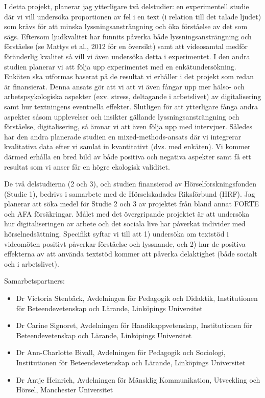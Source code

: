 \documentclass[]{article}
\providecommand{\tightlist}{%
  \setlength{\itemsep}{0pt}\setlength{\parskip}{0pt}}
\begin{document}
I detta projekt, planerar jag ytterligare två delstudier: en
experimentell studie där vi vill undersöka proportionen av fel i en text
(i relation till det talade ljudet) som krävs för att minska
lyssningsansträngning och öka förståelse av det som sägs. Eftersom
ljudkvalitet har funnits påverka både lyssningsansträngning och
förståelse (se Mattys et al., 2012 för en översikt) samt att videosamtal
medför föränderlig kvalitet så vill vi även undersöka detta i
experimentet. I den andra studien planerar vi att följa upp experimentet
med en enkätundersökning. Enkäten ska utformas baserat på de resultat vi
erhåller i det projekt som redan är finansierat. Denna ansats gör att vi
att vi även fångar upp mer hälso- och arbetspsykologiska aspekter (exv.
stress, deltagande i arbetslivet) av digitalisering samt hur textningens
eventuella effekter. Slutligen för att ytterligare fånga andra aspekter
såsom upplevelser och insikter gällande lyssningsansträngning och
förståelse, digitalisering, så ämnar vi att även följa upp med
intervjuer. Således har den andra planerade studien en
mixed-methods-ansats där vi integrerar kvalitativa data efter vi samlat
in kvantitativt (dvs. med enkäten). Vi kommer därmed erhålla en bred
bild av både positiva och negativa aspekter samt få ett resultat som vi
anser får en högre ekologisk validitet.

De två delstudierna (2 och 3), och studien finansierad av
Hörselforskningsfonden (Studie 1), bedrivs i samarbete med de
Hörselskadades Riksförbund (HRF). Jag planerar att söka medel för Studie
2 och 3 av projektet från bland annat FORTE och AFA försäkringar. Målet
med det övergripande projektet är att undersöka hur digitaliseringen av
arbete och det sociala live har påverkat individer med
hörselnedsättning. Specifikt syftar vi till att 1) undersöka om textstöd
i videomöten positivt påverkar förståelse och lyssnande, och 2) hur de
positiva effekterna av att använda textstöd kommer att påverka
delaktighet (både socialt och i arbetslivet).

Samarbetspartners:

\begin{itemize}
\tightlist
\item
  Dr Victoria Stenbäck, Avdelningen för Pedagogik och Didaktik,
  Institutionen för Beteendevetenskap och Lärande, Linköpings
  Universitet
\item
  Dr Carine Signoret, Avdelningen för Handikappvetenskap, Institutionen
  för Beteendevetenskap och Lärande, Linköpings Universitet
\item
  Dr Ann-Charlotte Bivall, Avdelningen för Pedagogik och Sociologi,
  Institutionen för Beteendevetenskap och Lärande, Linköpings
  Universitet
\item
  Dr Antje Heinrich, Avdelningen för Mänsklig Kommunikation, Utveckling
  och Hörsel, Manchester Universitet
\end{itemize}
\end{document}
